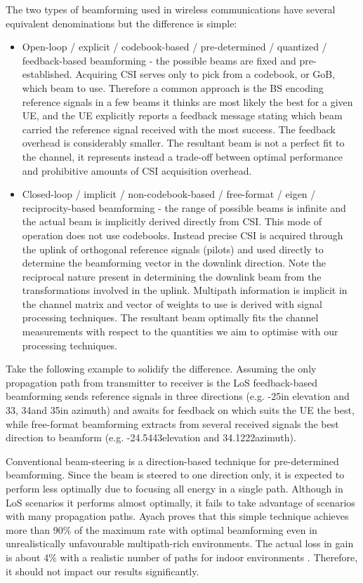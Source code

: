 The two types of beamforming used in wireless communications have several equivalent denominations but the difference is simple:
\begin{itemize}
    \item Open-loop / explicit / codebook-based / pre-determined / quantized / feedback-based beamforming - the possible beams are fixed and pre-established. Acquiring \ac{CSI} serves only to pick from a codebook, or \ac{GoB}, which beam to use. Therefore a common approach is the \ac{BS} encoding reference signals in a few beams it thinks are most likely the best for a given \ac{UE}, and the \ac{UE} explicitly reports a feedback message stating which beam carried the reference signal received with the most success. The feedback overhead is considerably smaller. The resultant beam is not a perfect fit to the channel, it represents instead a trade-off between optimal performance and prohibitive amounts of \ac{CSI} acquisition overhead.
    \item Closed-loop / implicit / non-codebook-based / free-format / eigen / reciprocity-based beamforming - the range of possible beams is infinite and the actual beam is implicitly derived directly from \ac{CSI}. This mode of operation does not use codebooks. Instead precise \ac{CSI} is acquired through the uplink of orthogonal reference signals (pilots) and used directly to determine the beamforming vector in the downlink direction. Note the reciprocal nature present in determining the downlink beam from the transformations involved in the uplink. Multipath information is implicit in the channel matrix and vector of weights to use is derived with signal processing techniques. The resultant beam optimally fits the channel measurements with respect to the quantities we aim to optimise with our processing techniques.
\end{itemize}

Take the following example to solidify the difference. Assuming the only propagation path from transmitter to receiver is the \ac{LoS} feedback-based beamforming sends reference signals in three directions (e.g. -25\tdeg in elevation and 33\tdeg, 34\tdeg and 35\tdeg in azimuth) and awaits for feedback on which suits the \ac{UE} the best, while free-format beamforming extracts from several received signals the best direction to beamform (e.g. -24.5443\tdeg elevation and 34.1222\tdeg azimuth).

Conventional beam-steering is a direction-based technique for pre-determined beamforming. Since the beam is steered to one direction only, it is expected to perform less optimally due to focusing all energy in a single path. Although in \ac{LoS} scenarios it performs almost optimally, it fails to take advantage of scenarios with many propagation paths. Ayach \cite{6292865} proves that this simple technique achieves more than 90\% of the maximum rate with optimal beamforming even in unrealistically unfavourable multipath-rich environments. The actual loss in gain is about 4\% with a realistic number of paths for indoor environments \cite{8891356}. Therefore, it should not impact our results significantly.


